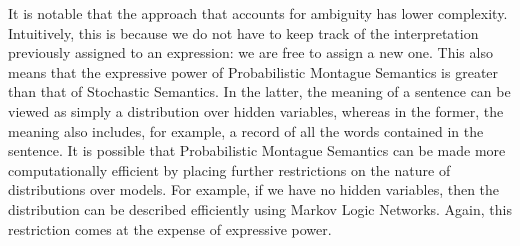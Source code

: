 \documentclass[a4paper,11pt]{article}
\renewcommand{\cite}{\citep}
\theoremstyle{definition}
\begin{document}
It is notable that the approach that accounts for ambiguity has lower
complexity.
Intuitively, this is because we
do not have to keep track of the interpretation previously assigned to
an expression: we are free to assign a new one. This also means that the expressive power of Probabilistic Montague
Semantics is greater than that of Stochastic Semantics. In the latter, the
meaning of a sentence can be viewed as simply a distribution over
hidden variables, whereas in the former, the meaning also
includes, for example, a record of all the words contained in the
sentence.
It is possible that Probabilistic Montague Semantics can be made more
computationally efficient by placing further restrictions on the
nature of distributions over models. For example, if we have no hidden
variables, then the distribution
can be described efficiently using Markov Logic Networks. Again, this
restriction comes at the expense of expressive power.





\end{document}
